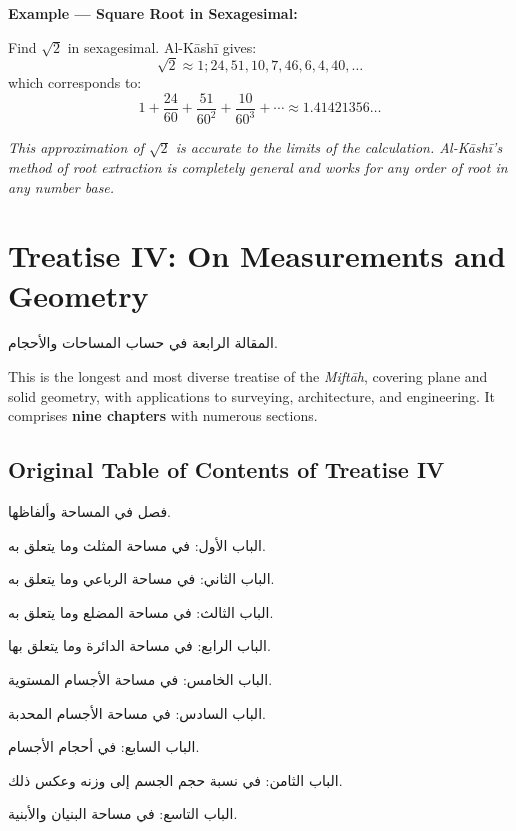 \documentclass[11pt,a4paper]{article}
\newenvironment{arabicbox}{%
  \begin{framed}
  \begin{minipage}{\dimexpr\linewidth-2\fboxsep-2\fboxrule\relax}
  \setlength{\parindent}{0pt}
  \linespread{1.3}\selectfont
}{%
  \end{minipage}
  \end{framed}
}
\newcommand{\cnote}[1]{\textcolor{notecolor}{\textit{#1}}}
\begin{document}
\noindent\textbf{Example --- Square Root in Sexagesimal:}

Find $\sqrt{2}$ in sexagesimal. Al-K\=ash\=i gives:
\[
\sqrt{2} \approx 1; 24, 51, 10, 7, 46, 6, 4, 40, \ldots
\]
which corresponds to:
\[
1 + \frac{24}{60} + \frac{51}{60^2} + \frac{10}{60^3} + \cdots \approx
1.41421356\ldots
\]

\cnote{This approximation of $\sqrt{2}$ is accurate to the limits of
the calculation. Al-K\=ash\=i's method of root extraction is completely
general and works for any order of root in any number base.}
\clearpage

\section{Treatise IV: On Measurements and Geometry}
\label{sec:treatise4}

\begin{arabicbox}
\begin{Arabic}
المقالة الرابعة في حساب المساحات والأحجام.
\end{Arabic}
\end{arabicbox}

\vspace{0.3cm}

\noindent This is the longest and most diverse treatise of the
\textit{Mift\=ah}, covering plane and solid geometry, with applications to
surveying, architecture, and engineering. It comprises \textbf{nine
chapters} with numerous sections.

\subsection{Original Table of Contents of Treatise IV}

\begin{arabicbox}
\begin{Arabic}
فصل في المساحة وألفاظها.

الباب الأول: في مساحة المثلث وما يتعلق به.

الباب الثاني: في مساحة الرباعي وما يتعلق به.

الباب الثالث: في مساحة المضلع وما يتعلق به.

الباب الرابع: في مساحة الدائرة وما يتعلق بها.

الباب الخامس: في مساحة الأجسام المستوية.

الباب السادس: في مساحة الأجسام المحدبة.

الباب السابع: في أحجام الأجسام.

الباب الثامن: في نسبة حجم الجسم إلى وزنه وعكس ذلك.

الباب التاسع: في مساحة البنيان والأبنية.
\end{Arabic}
\end{arabicbox}
\end{document}
